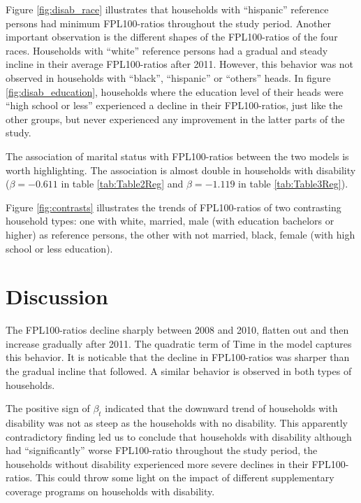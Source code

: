 \documentclass[11pt]{extarticle} %
\begin{document}
Figure \ref{fig:disab_race} illustrates that households with ``hispanic'' reference persons had minimum FPL100-ratios throughout the study period. Another important observation is the different shapes of the FPL100-ratios of the four races. Households with ``white'' reference persons had a gradual and steady incline in their average FPL100-ratios after 2011. However, this behavior was not observed in households with ``black'', ``hispanic'' or ``others'' heads. In figure \ref{fig:disab_education}, households where the education level of their heads were ``high school or less'' experienced a decline in their FPL100-ratios, just like the other groups, but never experienced any improvement in the latter parts of the study. 

The association of marital status with FPL100-ratios between the two models is worth highlighting. The association is almost double in households with disability ($\beta = -0.611$ in table \ref{tab:Table2Reg} and $\beta=-1.119$ in table \ref{tab:Table3Reg}). 

Figure \ref{fig:contrasts} illustrates the trends of FPL100-ratios of two contrasting household types: one with white, married, male (with education bachelors or higher) as reference persons, the other with not married, black, female (with high school or less education). 

\section*{Discussion}
The FPL100-ratios decline sharply between 2008 and 2010, flatten out and then increase gradually after 2011. The quadratic term of Time in the model captures this behavior. It is noticable that the decline in FPL100-ratios was sharper than the gradual incline that followed. A similar behavior is observed in both types of households. 

The positive sign of $\beta_t$ indicated that the downward trend of households with disability was not as steep as the households with no disability. This apparently contradictory finding led us to conclude that households with disability although had ``significantly'' worse FPL100-ratio throughout the study period, the households without disability experienced more severe declines in their FPL100-ratios. This could throw some light on the impact of different supplementary coverage programs on households with disability.
\end{document}
